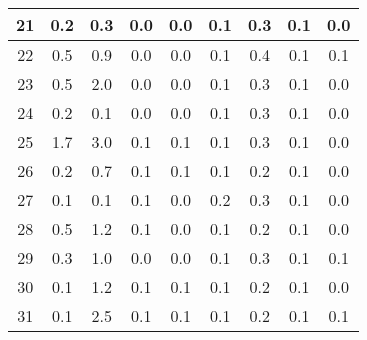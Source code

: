 \begin{table}[h!]
\begin{tabular}{|c|c|c|c|c|c|c|c|c|}
21           & 0.2 & 0.3 & 0.0 & 0.0  & 0.1  & 0.3  & 0.1   & 0.0   \\ \hline
22           & 0.5 & 0.9 & 0.0 & 0.0  & 0.1  & 0.4  & 0.1   & 0.1   \\ \hline
23           & 0.5 & 2.0 & 0.0 & 0.0  & 0.1  & 0.3  & 0.1   & 0.0   \\ \hline
24           & 0.2 & 0.1 & 0.0 & 0.0  & 0.1  & 0.3  & 0.1   & 0.0   \\ \hline
25           & 1.7 & 3.0 & 0.1 & 0.1  & 0.1  & 0.3  & 0.1   & 0.0   \\ \hline
26           & 0.2 & 0.7 & 0.1 & 0.1  & 0.1  & 0.2  & 0.1   & 0.0   \\ \hline
27           & 0.1 & 0.1 & 0.1 & 0.0  & 0.2  & 0.3  & 0.1   & 0.0   \\ \hline
28           & 0.5 & 1.2 & 0.1 & 0.0  & 0.1  & 0.2  & 0.1   & 0.0   \\ \hline
29           & 0.3 & 1.0 & 0.0 & 0.0  & 0.1  & 0.3  & 0.1   & 0.1   \\ \hline
30           & 0.1 & 1.2 & 0.1 & 0.1  & 0.1  & 0.2  & 0.1   & 0.0   \\ \hline
31           & 0.1 & 2.5 & 0.1 & 0.1  & 0.1  & 0.2  & 0.1   & 0.1   \\ \hline
\end{tabular}
\end{table}



